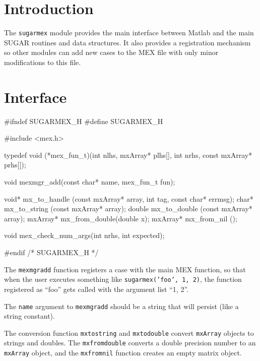 
\section{Introduction}

The {\tt{}sugarmex} module provides the main interface between Matlab
and the main SUGAR routines and data structures.  It also provides
a registration mechanism so other modules can add new cases to the
MEX file with only minor modifications to this file.


\section{Interface}

\endmoddef
#ifndef SUGARMEX_H
#define SUGARMEX_H

#include <mex.h>

typedef void (*mex_fun_t)(int nlhs, mxArray* plhs[], 
                          int nrhs, const mxArray* prhs[]);

void mexmgr_add(const char* name, mex_fun_t fun);

void*    mx_to_handle  (const mxArray* array, int tag, const char* errmsg);
char*    mx_to_string  (const mxArray* array);
double   mx_to_double  (const mxArray* array);
mxArray* mx_from_double(double x);
mxArray* mx_from_nil   ();

void     mex_check_num_args(int nrhs, int expected);

#endif /* SUGARMEX_H */
\nwendcode{}\nwdocspar

The {\tt{}mexmgr{}add} function registers a case with the main
MEX function, so that when the user executes something like
{\tt{}sugarmex('foo',\ 1,\ 2)}, the function registered as ``foo''
gets called with the argument list ``1, 2''.

The {\tt{}name} argument to {\tt{}mexmgr{}add} should be a string
that will persist (like a string constant).

The conversion function {\tt{}mx{}to{}string} and {\tt{}mx{}to{}double}
convert {\tt{}mxArray} objects to strings and doubles.
The {\tt{}mx{}from{}double} converts a double precision number
to an {\tt{}mxArray} object, and the {\tt{}mx{}from{}nil} function
creates an empty matrix object.


